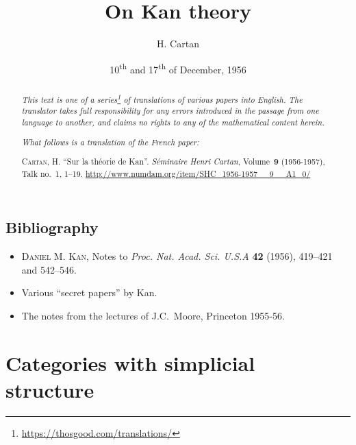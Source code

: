 \documentclass{article}
\title{On Kan theory}
\author{H. Cartan}
\date{10\textsuperscript{th} and 17\textsuperscript{th} of December, 1956}
\theoremstyle{plain}
\theoremstyle{definition}
\newcommand{\oldpage}[1]{\marginpar{\footnotesize$\Big\vert$ \textit{p.~#1}}}
\begin{document}
\maketitle
\thispagestyle{fancy}

\renewcommand{\abstractname}{Translator's note.}

\begin{abstract}
  \renewcommand*{\thefootnote}{\fnsymbol{footnote}}
  \emph{This text is one of a series\footnote{\url{https://thosgood.com/translations/}} of translations of various papers into English.}
  \emph{The translator takes full responsibility for any errors introduced in the passage from one language to another, and claims no rights to any of the mathematical content herein.}

  \medskip
  
  \emph{What follows is a translation of the French paper:}

  \medskip\noindent
  \textsc{Cartan, H.}
  ``Sur la th\'{e}orie de Kan''.
  \emph{S\'{e}minaire Henri Cartan}, Volume~\textbf{9} (1956-1957), Talk no.~1, 1–19.
  {\footnotesize\url{http://www.numdam.org/item/SHC_1956-1957__9__A1_0/}}
\end{abstract}

\setcounter{footnote}{0}

\tableofcontents
\bigskip



\oldpage{1-01}
\subsection*{Bibliography}

\begin{itemize}
  \item \textsc{Daniel M. Kan}, Notes to \emph{Proc. Nat. Acad. Sci. U.S.A} \textbf{42} (1956), 419--421 and 542--546.
  \item Various ``secret papers'' by Kan.
  \item The notes from the lectures of J.C.~Moore, Princeton 1955-56.
\end{itemize}


\section{Categories with simplicial structure}
\label{section1}
\end{document}
